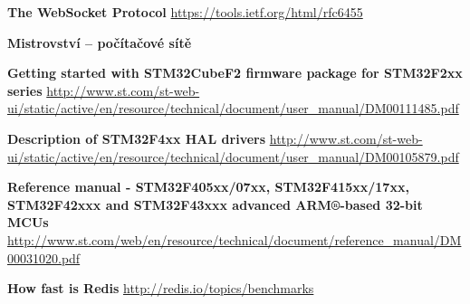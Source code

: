 \documentclass[oneside,12pt,a4paper]{book} %
\begin{document}









\begin{thebibliography}{9}
 {\bf The WebSocket Protocol} \url{https://tools.ietf.org/html/rfc6455}

 {\bf Mistrovství – počítačové sítě}

 {\bf Getting started with STM32CubeF2 firmware package for STM32F2xx series} \url{http://www.st.com/st-web-ui/static/active/en/resource/technical/document/user_manual/DM00111485.pdf}

 {\bf Description of STM32F4xx HAL drivers} \url{http://www.st.com/st-web-ui/static/active/en/resource/technical/document/user_manual/DM00105879.pdf}

 {\bf Reference manual - STM32F405xx/07xx, STM32F415xx/17xx, STM32F42xxx and
STM32F43xxx advanced ARM®-based 32-bit MCUs} \url{http://www.st.com/web/en/resource/technical/document/reference_manual/DM00031020.pdf}

 {\bf How fast is Redis} \url{http://redis.io/topics/benchmarks}
\end{thebibliography}
\end{document}
